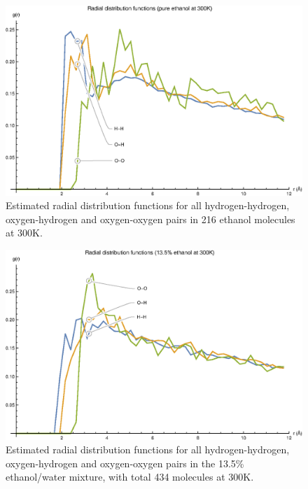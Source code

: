 \documentclass[11pt,a4paper]{article}
\begin{document}
\begin{figure}
\centering
\includegraphics[scale=0.8]{figures/rdfethanol}
\caption{Estimated radial distribution functions for all hydrogen-hydrogen, oxygen-hydrogen and oxygen-oxygen pairs in 216 ethanol molecules at 300K.}\label{fig:rdfethanol}
\end{figure}

\begin{figure}
\centering
\includegraphics[scale=0.8]{figures/rdfmix}
\caption{Estimated radial distribution functions for all hydrogen-hydrogen, oxygen-hydrogen and oxygen-oxygen pairs in the 13.5\% ethanol/water mixture, with total 434 molecules at 300K.}\label{fig:rdfmix}
\end{figure}

\clearpage
\end{document}
